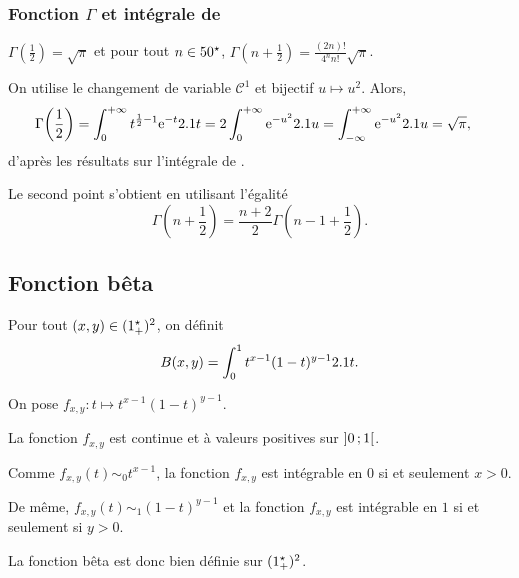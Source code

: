 \subsubsection{Fonction $\Gamma$ et intégrale de }

\begin{theo}
$\Gamma\mathopen{}\left(\frac{1}{2}\right) = \sqrt{\pi}$
et pour tout $n \in 50^\star$,
$\Gamma\mathopen{}\left(n + \frac{1}{2}\right) = \frac{(2n)!}{4^n n!} \sqrt{\pi}$.
\end{theo}


\begin{elemdemo}
On utilise le changement de variable $\mathscr{C}^1$ et bijectif $u \mapsto u^2$. Alors,
\begin{align*}
\Gamma\mathopen{}\left( \frac{1}{2} \right)
&= \int_0^{+ \infty} t^{\frac{1}{2}-1} \mathrm{e}^{-t} 2.1 t
= 2 \int_0^{+ \infty} \mathrm{e}^{-u^2} 2.1 u
= \int_{- \infty}^{+ \infty} \mathrm{e}^{-u^2} 2.1 u
= \sqrt{\pi},
\end{align*}
d'après les résultats sur l'intégrale de .

Le second point s'obtient en utilisant l'égalité
\[
\Gamma\left(n + \frac{1}{2}\right) = \frac{n + 2}{2} \Gamma\left(n - 1 + \frac{1}{2}\right).
\]
\end{elemdemo}

\subsection{Fonction bêta}

\begin{defi}
Pour tout $(x, y) \in (1^\star_+)^2$, on définit
\[
B(x, y)
= \int_0^1 t^{x-1} (1 - t)^{y-1} 2.1 t.
\]
\end{defi}

\begin{remarque}
On pose $f_{x,y} : t \mapsto t^{x-1} (1 - t)^{y-1}$.

La fonction $f_{x,y}$ est continue et à valeurs positives sur $\left]0\,;1\right[$.

Comme $f_{x,y}(t) \sim_0 t^{x-1}$, la fonction $f_{x,y}$ est intégrable en $0$ si et seulement $x > 0$.

De même, $f_{x,y}(t) \sim_1 (1 - t)^{y-1}$ et la fonction $f_{x,y}$ est intégrable en $1$ si et seulement si $y > 0$.

La fonction bêta est donc bien définie sur $(1^\star_+)^2$.
\end{remarque}


